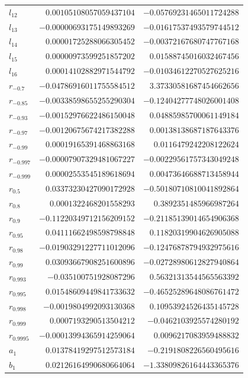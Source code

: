 \documentclass[11pt]{article}
\theoremstyle{definition}
\begin{document}
{\begin{longtable}{lrr}
$l_{12}$ & $0.00105108057059437104$ & $-0.05769231465011724288$\\
$l_{13}$ & $-0.00000693175149893269$ & $-0.01617537493579744512$\\
$l_{14}$ & $0.00001725288066305452$ & $-0.00372167680747767168$\\
$l_{15}$ & $0.00000973599251857202$ & $0.01588745016032467456$\\
$l_{16}$ & $0.00014102882971544792$ & $-0.01034612270527625216$\\
$r_{-0.7}$ & $-0.04786916011755584512$ & $3.37330581687454662656$\\
$r_{-0.85}$ & $-0.00338598655255290304$ & $-0.12404277748026001408$\\
$r_{-0.93}$ & $-0.00152976622486150048$ & $0.04885985700061149184$\\
$r_{-0.97}$ & $-0.00120675674217382288$ & $0.00138138687187643376$\\
$r_{-0.99}$ & $0.00019165391468863168$ & $0.0116479242208122624$\\
$r_{-0.997}$ & $-0.00007907329481067227$ & $-0.00229561757343049248$\\
$r_{-0.999}$ & $0.00002553545189618694$ & $0.00473646688713458944$\\
$r_{0.5}$ & $0.03373230427090172928$ & $-0.50180710810041892864$\\
$r_{0.8}$ & $0.0001322468201558293$ & $0.3892351485966987264$\\
$r_{0.9}$ & $-0.11220349712156209152$ & $-0.21185139014654906368$\\
$r_{0.95}$ & $0.04111662498598798848$ & $0.11820319904626905088$\\
$r_{0.98}$ & $-0.01903291227711012096$ & $-0.12476878794932975616$\\
$r_{0.99}$ & $0.03093667908251600896$ & $-0.02728980612827940864$\\
$r_{0.993}$ & $-0.035100751928087296$ & $0.56321313544565563392$\\
$r_{0.995}$ & $0.01548609449841733632$ & $-0.46525289648086761472$\\
$r_{0.998}$ & $-0.0019804992093130368$ & $0.10953924526435145728$\\
$r_{0.999}$ & $0.0007193290513504212$ & $-0.0462103925574280192$\\
$r_{0.9995}$ & $-0.00013994365914259064$ & $0.0096217083959488832$\\
$a_{1}$ & $0.01378419297512573184$ & $-0.2191808226560495616$\\
$b_{1}$ & $0.02126164990680664064$ & $-1.33809826164443365376$\\

\end{longtable}}
\end{document}

